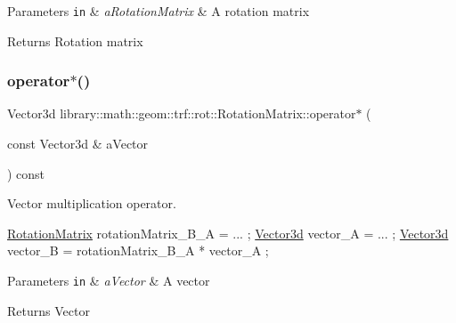 \begin{DoxyParams}[1]{Parameters}
\mbox{\tt in}  & {\em a\+Rotation\+Matrix} & A rotation matrix \\
\hline
\end{DoxyParams}
\begin{DoxyReturn}{Returns}
Rotation matrix 
\end{DoxyReturn}
\mbox{\label{classlibrary_1_1math_1_1geom_1_1trf_1_1rot_1_1_rotation_matrix_af4da3ca7389c4126aaf984b6f4340972}} 
\subsubsection{\texorpdfstring{operator$\ast$()}{operator*()}\hspace{0.1cm}{\footnotesize\ttfamily [2/2]}}
{\footnotesize\ttfamily Vector3d library\+::math\+::geom\+::trf\+::rot\+::\+Rotation\+Matrix\+::operator$\ast$ (\begin{DoxyParamCaption}\item[{const Vector3d \&}]{a\+Vector }\end{DoxyParamCaption}) const}



Vector multiplication operator. 


\begin{DoxyCode}
\hyperlink{classlibrary_1_1math_1_1geom_1_1trf_1_1rot_1_1_rotation_matrix_a667d2c05aa5b0cc88775938d11164cdc}{RotationMatrix} rotationMatrix\_B\_A = ... ;
\hyperlink{namespacelibrary_1_1math_1_1obj_a977e84e9bf317a4e7dd9d6d671d6da2f}{Vector3d} vector\_A = ... ;
\hyperlink{namespacelibrary_1_1math_1_1obj_a977e84e9bf317a4e7dd9d6d671d6da2f}{Vector3d} vector\_B = rotationMatrix\_B\_A * vector\_A ;
\end{DoxyCode}



\begin{DoxyParams}[1]{Parameters}
\mbox{\tt in}  & {\em a\+Vector} & A vector \\
\hline
\end{DoxyParams}
\begin{DoxyReturn}{Returns}
Vector 
\end{DoxyReturn}
\mbox{\label{classlibrary_1_1math_1_1geom_1_1trf_1_1rot_1_1_rotation_matrix_a77fcfc0ab8ee5a5a47320a2315201461}} 
